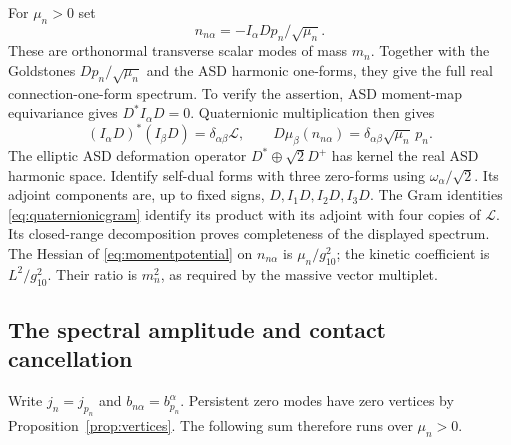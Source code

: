 For $\mu_n>0$ set
\begin{equation}\label{eq:normalmodes}
 n_{n\alpha}=-I_\alpha Dp_n/\sqrt{\mu_n}.
\end{equation}
These are orthonormal transverse scalar modes of mass $m_n$. Together
with the Goldstones $Dp_n/\sqrt{\mu_n}$ and the ASD harmonic one-forms,
they give the full real connection-one-form spectrum. To verify the
assertion, ASD moment-map equivariance gives $D^*I_\alpha D=0$.
Quaternionic multiplication then gives
\begin{equation}\label{eq:quaternionicgram}
 (I_\alpha D)^*(I_\beta D)=\delta_{\alpha\beta}\mathcal L,
 \qquad D\mu_\beta(n_{n\alpha})
             =\delta_{\alpha\beta}\sqrt{\mu_n}\,p_n.
\end{equation}
The elliptic ASD deformation operator $D^*\oplus\sqrt2D^+$ has
kernel the real ASD harmonic space. Identify self-dual forms with
three zero-forms using $\omega_\alpha/\sqrt2$. Its adjoint components
are, up to fixed signs, $D,I_1D,I_2D,I_3D$. The Gram identities
\eqref{eq:quaternionicgram} identify its product with its adjoint with
four copies of $\mathcal L$. Its closed-range decomposition proves
completeness of the displayed spectrum. The Hessian of
\eqref{eq:momentpotential} on $n_{n\alpha}$ is
$\mu_n/g_{10}^2$; the kinetic coefficient is $L^2/g_{10}^2$.
Their ratio is $m_n^2$, as required by the massive vector multiplet.

\subsection{The spectral amplitude and contact cancellation}
Write $j_n=j_{p_n}$ and $b_{n\alpha}=b_{p_n}^\alpha$. Persistent
zero modes have zero vertices by Proposition~\ref{prop:vertices}.
The following sum therefore runs over $\mu_n>0$.

